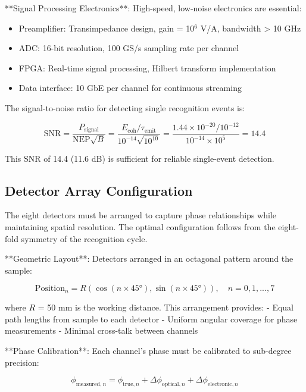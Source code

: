 \documentclass[12pt,a4paper]{report}
\begin{document}
**Signal Processing Electronics**: High-speed, low-noise electronics are essential:

\begin{itemize}
\item Preamplifier: Transimpedance design, gain = 10$^6$ V/A, bandwidth > 10 GHz
\item ADC: 16-bit resolution, 100 GS/s sampling rate per channel
\item FPGA: Real-time signal processing, Hilbert transform implementation
\item Data interface: 10 GbE per channel for continuous streaming
\end{itemize}

The signal-to-noise ratio for detecting single recognition events is:

\begin{equation}
\text{SNR} = \frac{P_{\text{signal}}}{\text{NEP} \sqrt{B}} = \frac{E_{\text{coh}}/\tau_{\text{emit}}}{10^{-14} \sqrt{10^{10}}} = \frac{1.44 \times 10^{-20}/10^{-12}}{10^{-14} \times 10^5} = 14.4
\end{equation}

This SNR of 14.4 (11.6 dB) is sufficient for reliable single-event detection.

\subsection{Detector Array Configuration}

The eight detectors must be arranged to capture phase relationships while maintaining spatial resolution. The optimal configuration follows from the eight-fold symmetry of the recognition cycle.

**Geometric Layout**: Detectors arranged in an octagonal pattern around the sample:

\begin{equation}
\text{Position}_n = R(\cos(n \times 45°), \sin(n \times 45°)), \quad n = 0, 1, ..., 7
\end{equation}

where $R$ = 50 mm is the working distance. This arrangement provides:
- Equal path lengths from sample to each detector
- Uniform angular coverage for phase measurements
- Minimal cross-talk between channels

**Phase Calibration**: Each channel's phase must be calibrated to sub-degree precision:

\begin{equation}
\phi_{\text{measured},n} = \phi_{\text{true},n} + \Delta\phi_{\text{optical},n} + \Delta\phi_{\text{electronic},n}
\end{equation}
\end{document}
